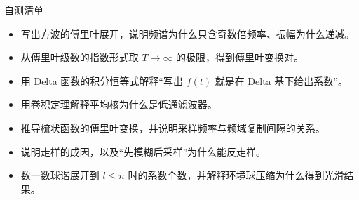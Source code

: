 \documentclass[a4paper]{article}
\begin{document}
\begin{practicebox}{自测清单}
\begin{itemize}
\item 写出方波的傅里叶展开，说明频谱为什么只含奇数倍频率、振幅为什么递减。
\item 从傅里叶级数的指数形式取 $T\to\infty$ 的极限，得到傅里叶变换对。
\item 用 Delta 函数的积分恒等式解释“写出 $f(t)$ 就是在 Delta 基下给出系数”。
\item 用卷积定理解释平均核为什么是低通滤波器。
\item 推导梳状函数的傅里叶变换，并说明采样频率与频域复制间隔的关系。
\item 说明走样的成因，以及“先模糊后采样”为什么能反走样。
\item 数一数球谐展开到 $l\le n$ 时的系数个数，并解释环境球压缩为什么得到光滑结果。
\end{itemize}
\end{practicebox}
\end{document}
